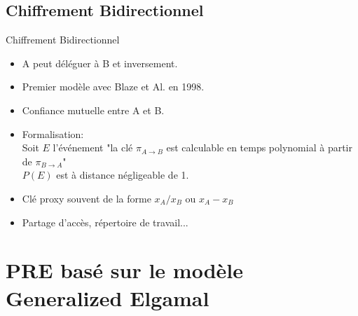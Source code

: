 \documentclass{beamer}
\begin{document}
\subsection{Chiffrement Bidirectionnel}

\begin{frame}{Chiffrement Bidirectionnel}
		\begin{itemize}
		\item A peut déléguer à B et inversement. \pause
		\item Premier modèle avec Blaze et Al. en 1998. \pause
		\item Confiance mutuelle entre A et B. \pause
		\item Formalisation:\\ \pause
		Soit $E$ l'événement "la clé $\pi_{A\to B}$ est calculable en temps polynomial à partir de $\pi_{B\to A}$"\\ \pause
		$P(E)$ est à distance négligeable de 1. \pause
		\item Clé proxy souvent de la forme $x_A/x_B$ ou $x_A-x_B$ \pause
		\item Partage d'accès, répertoire de travail... \pause
		\end{itemize}
\end{frame}


\section{PRE basé sur le modèle Generalized Elgamal}
\end{document}

